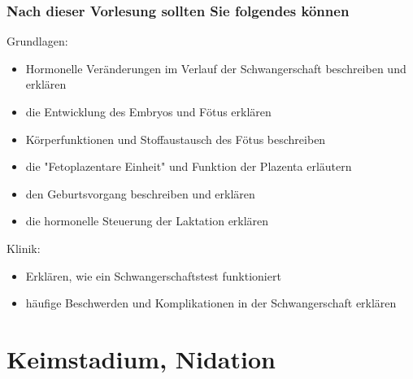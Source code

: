 \documentclass{beamer}
\begin{document}
\begin{frame}

 \frametitle{Nach dieser Vorlesung sollten Sie folgendes können}



\begin{block}{Grundlagen:}
\begin{itemize}
\item
Hormonelle Veränderungen im Verlauf der Schwangerschaft beschreiben und erklären
\item
die Entwicklung des Embryos und Fötus erklären 
\item
Körperfunktionen und Stoffaustausch des Fötus beschreiben
\item
die "Fetoplazentare Einheit" und Funktion der Plazenta erläutern
\item
den Geburtsvorgang beschreiben und erklären
\item
die hormonelle Steuerung der Laktation erklären

\end{itemize}

\end{block}



\begin{block}{Klinik:}
\begin{itemize}
\item
Erklären, wie ein Schwangerschaftstest funktioniert
\item
häufige Beschwerden und Komplikationen in der Schwangerschaft erklären

\end{itemize}

\end{block}

\end{frame}






 

\section{Keimstadium, Nidation}
\end{document}
